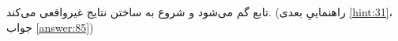 \section{}
\paragraph{}\label{hint:19}
تابع  گم می‌شود و شروع به ساختن نتایج غیرواقعی می‌کند. (راهنماییِ بعدی \ref{hint:31}، جواب \ref{answer:85})